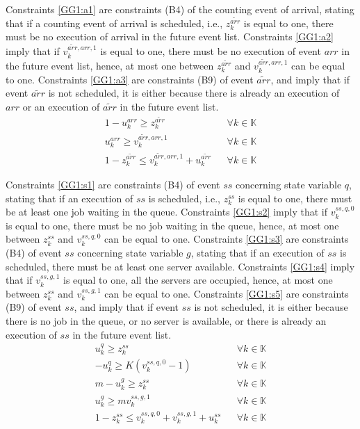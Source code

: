 \documentclass[suppldata]{interact}
\theoremstyle{plain}
\theoremstyle{definition}
\theoremstyle{remark}
\begin{document}
Constraints \eqref{GG1:a1} are constraints (B4) of the counting event of arrival, stating that if a counting event of arrival is scheduled, i.e., $z^{\tilde{arr}}_{k}$ is equal to one, there must be no execution of arrival in the future event list. Constraints \eqref{GG1:a2} imply that if $v^{\tilde{arr},arr,1}_k$ is equal to one, there must be no execution of event ${arr}$ in the future event list, hence, at most one between $z^{\tilde{arr}}_{k}$ and $v^{\tilde{arr},arr,1}_k$ can be equal to one. Constraints \eqref{GG1:a3} are constraints (B9) of event ${\tilde{arr}}$, and imply that if event ${\tilde{arr}}$ is not scheduled, it is either because there is already an execution of ${arr}$ or an execution of ${\tilde{arr}}$ in the future event list. 
\begin{eqnarray}
	1-u^{arr}_{k} \ge z^{\tilde{arr}}_{k} &&\forall k\in \mathbb{K} \label{GG1:a1}\\
	u^{arr}_{k} \ge v^{\tilde{arr},arr,1}_k &&\forall k\in \mathbb{K} \label{GG1:a2}\\
	1-z^{\tilde{arr}}_{k}\le  v^{\tilde{arr},arr,1}_k +u^{\tilde{arr}}_k&&\forall k\in \mathbb{K}\label{GG1:a3}
\end{eqnarray}

Constraints \eqref{GG1:s1} are constraints (B4) of event ${ss}$ concerning state variable $q$, stating that if an execution of ${ss}$ is scheduled, i.e., $z^{ss}_{k}$ is equal to one, there must be at least one job waiting in the queue. Constraints \eqref{GG1:s2} imply that if $v^{ss,q,0}_k$ is equal to one, there must be no job waiting in the queue, hence, at most one between $z^{ss}_{k}$ and $v^{ss,q,0}_k$ can be equal to one. Constraints \eqref{GG1:s3} are constraints (B4) of event ${ss}$ concerning state variable $g$, stating that if an execution of ${ss}$ is scheduled, there must be at least one server available. Constraints \eqref{GG1:s4} imply that if $v^{ss,g,1}_k$ is equal to one, all the servers are occupied, hence, at most one between $z^{ss}_{k}$ and $v^{ss,g,1}_k$ can be equal to one. Constraints \eqref{GG1:s5} are constraints (B9) of event ${ss}$, and imply that if event ${ss}$ is not scheduled, it is either because there is no job in the queue, or no server is available, or there is already an execution of ${ss}$ in the future event list. 
\begin{eqnarray}
	u^q_k \ge z^{ss}_{k}&&\forall k\in \mathbb{K} \label{GG1:s1}\\
	- u^q_k \ge K(v^{ss,q,0}_k-1)&&\forall k\in \mathbb{K} \label{GG1:s2}\\
	m-u^g_k \ge z^{ss}_{k}&&\forall k\in \mathbb{K} \label{GG1:s3}\\
	u^g_k  \ge mv^{ss,g,1}_k&&\forall k\in \mathbb{K} \label{GG1:s4}\\
	1-z^{ss}_{k}\le  v^{ss,q,0}_k+v^{ss,g,1}_k +u^{ss}_k&&\forall k\in \mathbb{K}\label{GG1:s5}
\end{eqnarray}
\end{document}

